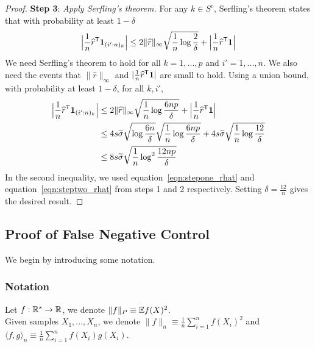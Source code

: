 \begin{proof}
\vskip5pt
\textbf{Step 3}: {\it Apply Serfling's theorem.}  
For any $k \in S^c$, Serfling's theorem states that with probability at least $1 - \delta$
\begin{align*}
\Big
|\frac{1}{n} \widehat{r}^{\mathsf{T}} \mbox{\boldmath $1$}_{(i':n)_k}\Big| \leq
   2\| \widehat{r} \|_\infty \sqrt{ \frac{1}{n} \log \frac{2}{\delta}} + 
   \Big|\frac{1}{n} \widehat{r}^{\mathsf{T}} \mbox{\boldmath $1$} \Big|
\end{align*}
We need Serfling's theorem to hold for all $k = 1,...,p$ and $i' =
1,...,n$. We also need the events that $\|\hat{r}\|_\infty$ and $|
\frac{1}{n} \widehat{r}^{\mathsf{T}} \mbox{\boldmath $1$}|$ are small to hold. Using a
union bound, with probability at least $1-\delta$, for all $k,i'$,
\begin{align*}
\Big
|\frac{1}{n} \widehat{r}^{\mathsf{T}} \mbox{\boldmath $1$}_{(i':n)_k}\Big| &\leq
   2\| \widehat{r} \|_\infty \sqrt{ \frac{1}{n} \log \frac{6np}{\delta}} + 
   \Big|\frac{1}{n} \widehat{r}^{\mathsf{T}} \mbox{\boldmath $1$} \Big|\\
  &\leq 4s\widetilde{\sigma}\sqrt{\log \frac{6n}{\delta}} \sqrt{\frac{1}{n}\log \frac{6np}{\delta}} + 4 s \widetilde{\sigma} \sqrt{\frac{1}{n}\log \frac{12}{\delta}} \\
  &\leq 8 s\widetilde{\sigma} \sqrt{ \frac{1}{n} \log^2 \frac{12np}{\delta}}
\end{align*}
In the second inequality, we used equation~\eqref{eqn:stepone_rhat}
and equation~\eqref{eqn:steptwo_rhat} from steps 1 and 2
respectively. Setting $\delta = \frac{12}{n}$ gives the desired
result.
\end{proof}

 
 
 \subsection{Proof of False Negative Control}
 \label{sec:false_negative_proof}
 We begin by introducing some notation.
 \subsubsection{Notation} 
\label{sec:false_negative_proof_notations}

Let $f : \mathbb{R}^s \rightarrow {\mathbb R}$, we denote $\| f \|_P \equiv {\mathbb E} f(X)^2$. \\
Given samples $X_1,...,X_n$, we denote $\| f \|_n \equiv \frac{1}{n} \sum_{i=1}^n f(X_i)^2$ and $\langle f, g \rangle_n \equiv \frac{1}{n} \sum_{i=1}^n f(X_i) g(X_i)$. \\

